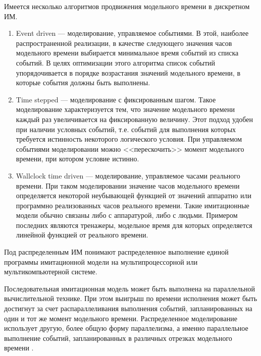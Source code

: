 Имеется несколько алгоритмов продвижения модельного времени в дискретном ИМ.
\begin{enumerate}
\item Event driven --- моделирование, управляемое событиями. В этой, наиболее распространенной реализации, в качестве следующего значения часов модельного времени выбирается минимальное время событий из списка событий. В целях оптимизации этого алгоритма список событий упорядочивается в порядке возрастания значений модельного времени, в которые события должны быть выполнены.
\item Time stepped --- моделирование с фиксированным шагом. Такое моделирование характеризуется тем, что значение модельного времени каждый раз увеличивается на фиксированную величину. Этот подход удобен при наличии условных событий, т.е. событий для выполнения которых требуется истинность некоторого логического условия. При управляемом событиями моделировании можно <<перескочить>> момент модельного времени, при котором условие истинно.
\item Wallclock time driven --- моделирование, управляемое часами реального времени. При таком моделировании значение часов модельного времени определяется некоторой неубывающей функцией от значений аппаратно или программно реализованных часов реального времени. Такие имитационные модели обычно связаны либо с аппаратурой, либо с людьми. Примером последних являются тренажеры, модельное время для которых определяется линейной функцией от реального времени.	
\end{enumerate}


Под распределенным ИМ понимают распределенное выполнение единой программы имитационной модели на мультипроцессорной или мультикомпьютерной системе.

Последовательная имитационная модель может быть выполнена на параллельной вычислительной технике. При этом выигрыш по времени исполнения может быть достигнут за счет распараллеливания выполнения событий, запланированных на один и тот же момент модельного времени. Распределенное моделирование использует другую, более общую форму параллелизма, а именно параллельное выполнение событий, запланированных в различных отрезках модельного времени \cite{okol}.

